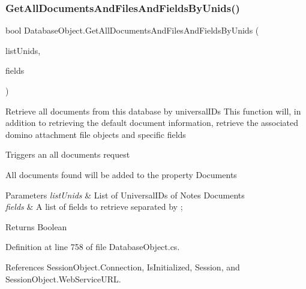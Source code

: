 \subsubsection{\texorpdfstring{Get\+All\+Documents\+And\+Files\+And\+Fields\+By\+Unids()}{GetAllDocumentsAndFilesAndFieldsByUnids()}\hspace{0.1cm}{\footnotesize\ttfamily [4/4]}}
{\footnotesize\ttfamily bool Database\+Object.\+Get\+All\+Documents\+And\+Files\+And\+Fields\+By\+Unids (\begin{DoxyParamCaption}\item[{I\+List}]{list\+Unids,  }\item[{string}]{fields }\end{DoxyParamCaption})}



Retrieve all documents from this database by universal\+I\+Ds This function will, in addition to retrieving the default document information, retrieve the associated domino attachment file objects and specific fields 

Triggers an all documents request

All documents found will be added to the property \textquotesingle{}Documents\textquotesingle{}


\begin{DoxyParams}{Parameters}
{\em list\+Unids} & List of Universal\+I\+Ds of Notes Documents\\
\hline
{\em fields} & A list of fields to retrieve separated by ; \\
\hline
\end{DoxyParams}
\begin{DoxyReturn}{Returns}
Boolean
\end{DoxyReturn}


Definition at line 758 of file Database\+Object.\+cs.



References Session\+Object.\+Connection, Is\+Initialized, Session, and Session\+Object.\+Web\+Service\+U\+RL.



